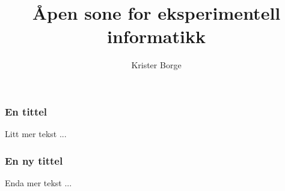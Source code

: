 \documentclass[12pt]{beamer}
\author{Krister Borge}
\title{Åpen sone for eksperimentell informatikk}
\begin{document}
\begin{frame}
  \frametitle{En tittel}
  Litt mer tekst ...
\end{frame}

\begin{frame}
  \frametitle{En ny tittel}
  Enda mer tekst ...
\end{frame}
\end{document}
